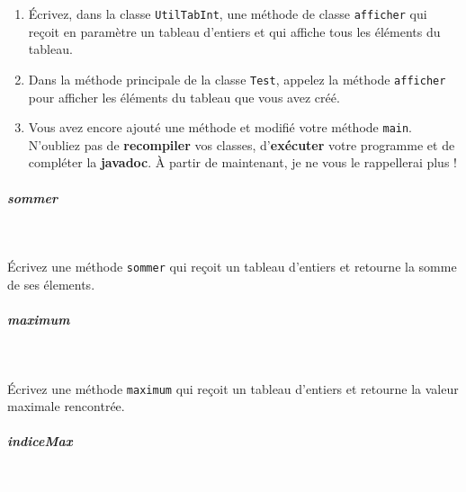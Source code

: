 \documentclass[11pt,a4paper]{article}
\begin{document}
					\begin{enumerate}
				
			\item 
					\'Ecrivez, dans la classe \verb|UtilTabInt|, 
					une m\'ethode de classe \verb|afficher| 
					qui re\c coit en param\`etre un tableau d'entiers et qui affiche tous les \'el\'ements du tableau.
				
			\item  
					Dans la m\'ethode principale de la classe 
					\verb|Test|, 
					appelez la m\'ethode \verb|afficher| 
					pour afficher les \'el\'ements du tableau que vous avez cr\'e\'e.
				
			\item  
					Vous avez encore ajout\'e une m\'ethode et modifi\'e votre m\'ethode \verb|main|. 
					N'oubliez pas de \textbf{recompiler} vos classes,
					d'\textbf{ex\'ecuter} votre programme
					et de compl\'eter la \textbf{javadoc}.
					\`A partir de maintenant, je ne vous le rappellerai plus !
					
					\end{enumerate}
				
			
		\subparagraph{sommer} 
		
					\textcolor{white}{.} \par
				
            \par
        
					\'Ecrivez une m\'ethode 
					\verb|sommer| 
					qui re\c coit un tableau d'entiers
					et retourne la somme de ses \'elements.
				
            \par
        
			
		\subparagraph{maximum} 
		
					\textcolor{white}{.} \par
				
            \par
        
					\'Ecrivez une m\'ethode 
					\verb|maximum| 
					qui re\c coit un tableau d'entiers
					et retourne la valeur maximale rencontr\'ee.
				
            \par
        
			
		\subparagraph{indiceMax} 
		
					\textcolor{white}{.} \par
				
            \par
        
\end{document}
